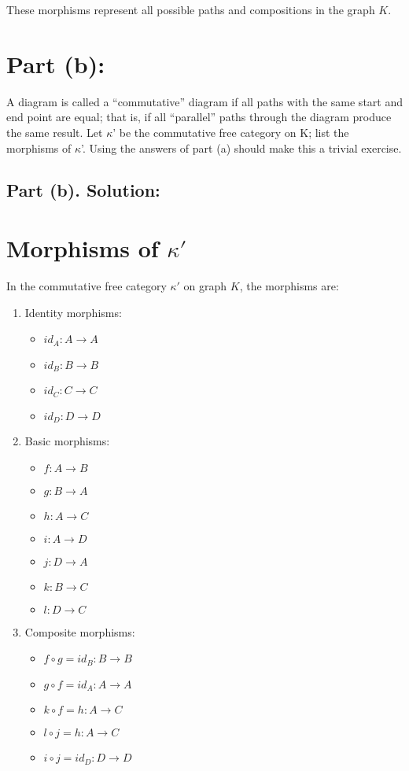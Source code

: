 \documentclass{article}
\begin{document}
These morphisms represent all possible paths and compositions in the graph \(K\).


\newpage

\section*{Part (b):} A diagram is called a “commutative” diagram if all paths with the same start and end point
are equal; that is, if all “parallel” paths through the diagram produce the same result. Let $\kappa$' be the
commutative free category on K; list the morphisms of $\kappa$'. Using the answers of part (a) should make
this a trivial exercise.

\subsection*{Part (b). Solution:}



\section*{Morphisms of \(\kappa'\)}

In the commutative free category \(\kappa'\) on graph \(K\), the morphisms are:

\begin{enumerate}
    \item Identity morphisms:
    \begin{itemize}
        \item \(id_A: A \to A\)
        \item \(id_B: B \to B\)
        \item \(id_C: C \to C\)
        \item \(id_D: D \to D\)
    \end{itemize}
    
    \item Basic morphisms:
    \begin{itemize}
        \item \(f: A \to B\)
        \item \(g: B \to A\)
        \item \(h: A \to C\)
        \item \(i: A \to D\)
        \item \(j: D \to A\)
        \item \(k: B \to C\)
        \item \(l: D \to C\)
    \end{itemize}
    
    \item Composite morphisms:
    \begin{itemize}
        \item \(f \circ g = id_B: B \to B\)
        \item \(g \circ f = id_A: A \to A\)
        \item \(k \circ f = h: A \to C\)
        \item \(l \circ j = h: A \to C\)
        \item \(i \circ j = id_D: D \to D\)
    \end{itemize}
\end{enumerate}
\end{document}
